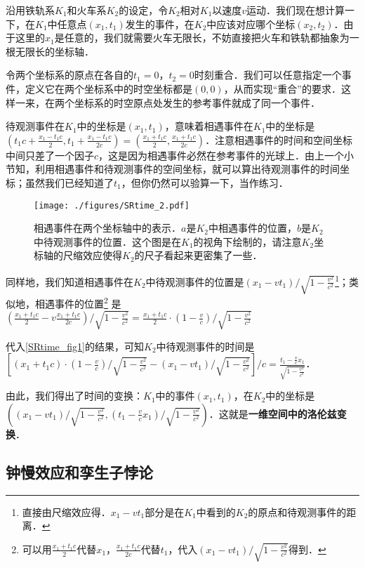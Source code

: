 沿用铁轨系$K_1$和火车系$K_2$的设定，令$K_2$相对$K_1$以速度$v$运动．我们现在想计算一下，在$K_1$中任意点$(x_1,t_1)$发生的事件，在$K_2$中应该对应哪个坐标$(x_2,t_2)$．由于这里的$x_1$是任意的，我们就需要火车无限长，不妨直接把火车和铁轨都抽象为一根无限长的坐标轴．

令两个坐标系的原点在各自的$t_1=0$，$t_2=0$时刻重合．我们可以任意指定一个事件，定义它在两个坐标系中的时空坐标都是$(0,0)$，从而实现“重合”的要求．这样一来，在两个坐标系的时空原点处发生的参考事件就成了同一个事件．

待观测事件在$K_1$中的坐标是$(x_1, t_1)$，意味着相遇事件在$K_1$中的坐标是$(t_1c+\frac{x_1-t_1c}{2}, t_1+\frac{x_1-t_1c}{2c})=(\frac{x_1+t_1c}{2},\frac{x_1+t_1c}{2c})$．注意相遇事件的时间和空间坐标中间只差了一个因子$c$，这是因为相遇事件必然在参考事件的光球上．由上一个小节知，利用相遇事件和待观测事件的空间坐标，就可以算出待观测事件的时间坐标；虽然我们已经知道了$t_1$，但你仍然可以验算一下，当作练习．

\begin{figure}[ht]
\centering
\texttt{[image: ./figures/SRtime\_2.pdf]}
\caption{相遇事件在两个坐标轴中的表示．$a$是$K_2$中相遇事件的位置，$b$是$K_2$中待观测事件的位置．这个图是在$K_1$的视角下绘制的，请注意$K_2$坐标轴的尺缩效应使得$K_2$的尺子看起来更密集了一些．} \label{SRtime_fig2}
\end{figure}

同样地，我们知道相遇事件在$K_2$中待观测事件的位置是$(x_1-vt_1)/\sqrt{1-\frac{v^2}{c^2}}$\footnote{直接由尺缩效应得．$x_1-vt_1$部分是在$K_1$中看到的$K_2$的原点和待观测事件的距离．}；类似地，相遇事件的位置\footnote{可以用$\frac{x_1+t_1c}{2}$代替$x_1$，$\frac{x_1+t_1c}{2c}$代替$t_1$，代入$(x_1-vt_1)/\sqrt{1-\frac{v^2}{c^2}}$得到．}  是$(\frac{x_1+t_1c}{2}-v\frac{x_1+t_1c}{2c})/\sqrt{1-\frac{v^2}{c^2}}=\frac{x_1+t_1c}{2}\cdot(1-\frac{v}{c})/\sqrt{1-\frac{v^2}{c^2}}$

代入\autoref{SRtime_fig1}的结果，可知$K_2$中待观测事件的时间是$[(x_1+t_1c)\cdot(1-\frac{v}{c})/\sqrt{1-\frac{v^2}{c^2}}-(x_1-vt_1)/\sqrt{1-\frac{v^2}{c^2}}]/c=\frac{t_1-\frac{v}{c}x_1}{\sqrt{1-\frac{v^2}{c^2}}}$．

由此，我们得出了时间的变换：$K_1$中的事件$(x_1, t_1)$，在$K_2$中的坐标是$((x_1-vt_1)/\sqrt{1-\frac{v^2}{c^2}}, (t_1-\frac{v}{c}x_1)/\sqrt{1-\frac{v^2}{c^2}})$．这就是\textbf{一维空间中的洛伦兹变换}．

\subsection{钟慢效应和孪生子悖论}

